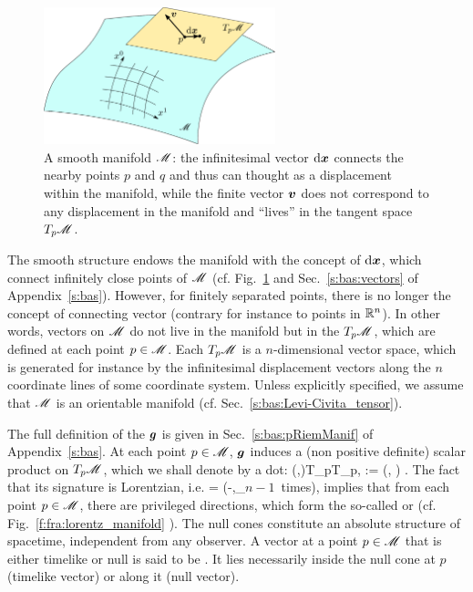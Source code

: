 \begin{figure}
\centerline{\includegraphics[width=0.6\textwidth]{fra_manifold.pdf}}
\caption[]{\label{f:fra:manifold} \footnotesize
A smooth manifold $\mathscr{M}$: the infinitesimal vector $\mathrm{d}\bm{x}$ connects the nearby points $p$ and $q$ and thus
can thought as a displacement within the manifold, while the finite vector $\bm{v}$ does not correspond to
any displacement in the manifold and ``lives'' in the tangent space $T_p\mathscr{M}$.}
\end{figure}


The smooth structure endows the manifold
with the concept of  $\mathrm{d}\bm{x}$, which connect infinitely
close points of $\mathscr{M}$ (cf. Fig.~\ref{f:fra:manifold} and Sec.~\ref{s:bas:vectors} of Appendix~\ref{s:bas}). However, for finitely separated points, there is no
longer the concept of connecting vector (contrary for instance to points in $\mathbb{R}^n$).
In other words, vectors on $\mathscr{M}$ do not live in the manifold but in the
 $T_p\mathscr{M}$, which are defined at each point $p\in\mathscr{M}$. Each  $T_p\mathscr{M}$
is a $n$-dimensional vector space, which is generated for instance by the infinitesimal displacement
vectors along the $n$ coordinate lines of some coordinate system.
Unless explicitly specified, we assume that $\mathscr{M}$ is an orientable manifold (cf. Sec.~\ref{s:bas:Levi-Civita_tensor}).

The full definition of the  $\bm{g}$ is given in Sec.~\ref{s:bas:pRiemManif} of
Appendix~\ref{s:bas}. At each point $p\in\mathscr{M}$, $\bm{g}$ induces a (non positive definite)
scalar product on $T_p\mathscr{M}$, which we shall denote by a dot:
\be
    \forall (,)\in T_p\M\times T_p\M, \quad
        \cdot{} := (, ) .
\ee
The fact that its signature is Lorentzian, i.e.
\be
{}\;  = (-,\underbrace{+,\ldots,+}_{\mbox{\small $n-1$ times}}),
\ee
implies that from each point $p\in\mathscr{M}$, there are privileged directions,
which form the so-called 
or  (cf. Fig.~\ref{f:fra:lorentz_manifold} ).
The null cones constitute an absolute structure of spacetime, independent from any observer.
A vector at a point $p\in\mathscr{M}$ that is either timelike or null is said to be .
It lies necessarily inside the null cone at $p$ (timelike vector) or along it (null vector).

